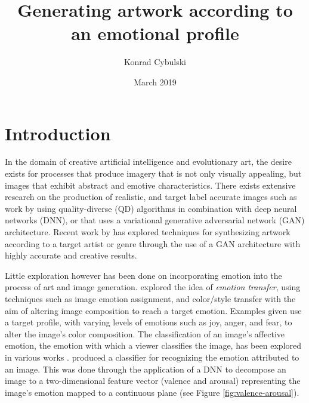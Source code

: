 \documentclass{article}
\title{Generating artwork according to an emotional profile}
\author{Konrad Cybulski}
\date{March 2019}
\begin{document}
	
	\maketitle
	
	\section{Introduction}
	
	In the domain of creative artificial intelligence and evolutionary art, the desire exists for processes that produce imagery that is not only visually appealing, but images that exhibit abstract and emotive characteristics.
	There exists extensive research on the production of realistic, and target label accurate images such as work by \citet{nguyen2015innovation} using quality-diverse (QD) algorithms in combination with deep neural networks (DNN), or \citet{bao2017cvae} that uses a variational generative adversarial network (GAN) architecture.
	Recent work by \citet{tan2017artgan} has explored techniques for synthesizing artwork according to a target artist or genre through the use of a GAN architecture with highly accurate and creative results.
	
	Little exploration however has been done on incorporating emotion into the process of art and image generation.
	\citet{ali2017emotional} explored the idea of \textit{emotion transfer}, using techniques such as image emotion assignment, and color/style transfer with the aim of altering image composition to reach a target emotion.
	Examples given use a target profile, with varying levels of emotions such as joy, anger, and fear, to alter the image's color composition.
	The classification of an image's affective emotion, the emotion with which a viewer classifies the image, has been explored in various works \citep{machajdik2010affective, chen2015learning, kim2018building}.
	\citet{kim2018building} produced a classifier for recognizing the emotion attributed to an image.
	This was done through the application of a DNN to decompose an image to a two-dimensional feature vector (valence and arousal) representing the image's emotion mapped to a continuous plane (see Figure \ref{fig:valence-arousal}).
	
\end{document}
